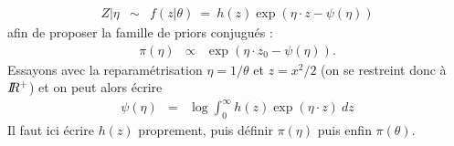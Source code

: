 \begin{rep}
\begin{enumerate}
\begin{eqnarray}
Z|\eta & \sim & f(z|\theta) \ = \ h(z) \exp\left(\eta\cdot z - \psi(\eta) \right) \label{conjugaison}
\end{eqnarray}
afin de proposer la  famille de priors  conjugués :
\begin{eqnarray*}
\pi(\eta) & \propto & \exp\left(\eta \cdot z_0 - \psi(\eta) \right). 
\end{eqnarray*}
Essayons avec la reparamétrisation $\eta  =  1/\theta$ et $z  =  x^2/2$ 
 (on se restreint donc à $I\!\!R^+$) et on peut alors écrire
\begin{eqnarray*}
\psi(\eta) & = & \log \int_0^{\infty}  h(z) \exp\left(\eta\cdot z\right) \ dz
\end{eqnarray*}
Il faut ici écrire $h(z)$ proprement, puis définir $\pi(\eta)$ puis enfin $\pi(\theta)$. 
\end{enumerate}
\end{rep}